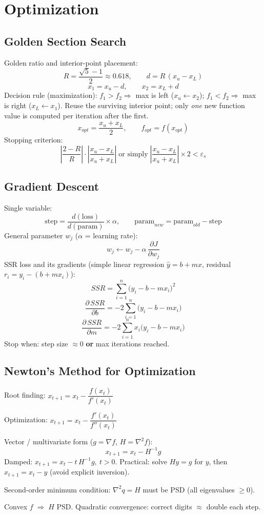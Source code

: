 \section{Optimization}

\subsection{Golden Section Search}
\begin{formulabox}
Golden ratio and interior-point placement:
\[
R = \frac{\sqrt5 - 1}{2} \approx 0.618, \qquad d = R\,(x_u - x_L)
\]
\[
x_1 = x_u - d, \qquad x_2 = x_L + d
\]
Decision rule (maximization): $f_1 > f_2 \Rightarrow$ max is left ($x_u \gets x_2$); $f_1 < f_2 \Rightarrow$ max is right ($x_L \gets x_1$).
Reuse the surviving interior point; only \emph{one} new function value is computed per iteration after the first.
\[
x_{opt} = \frac{x_u + x_L}{2}, \qquad f_{opt} = f(x_{opt})
\]
Stopping criterion:
\[
\left|\frac{2 - R}{R}\right|\cdot\left|\frac{x_u - x_L}{x_u+x_L}\right| \;\text{or simply}\; \left|\frac{x_u - x_L}{x_u + x_L}\right| \times 2 < \varepsilon_s
\]
\end{formulabox}

\subsection{Gradient Descent}
\begin{formulabox}
Single variable:
\[
\text{step} = \frac{d(\text{loss})}{d(\text{param})}\times \alpha, \qquad \text{param}_{new} = \text{param}_{old} - \text{step}
\]
General parameter $w_j$ ($\alpha$ = learning rate):
\[
w_j \leftarrow w_j - \alpha\,\frac{\partial J}{\partial w_j}
\]
SSR loss and its gradients (simple linear regression $\hat y = b + mx$, residual $r_i = y_i - (b+mx_i)$):
\[
SSR = \sum_{i=1}^n \big(y_i - b - m x_i\big)^2
\]
\[
\frac{\partial\, SSR}{\partial b} = -2\sum_{i=1}^n \big(y_i - b - mx_i\big)
\]
\[
\frac{\partial\, SSR}{\partial m} = -2\sum_{i=1}^n x_i\big(y_i - b - mx_i\big)
\]
Stop when: step size $\approx 0$ \textbf{or} max iterations reached.
\end{formulabox}

\subsection{Newton's Method for Optimization}
\begin{formulabox}
Root finding: \quad $x_{t+1} = x_t - \dfrac{f(x_t)}{f'(x_t)}$

Optimization: \quad $x_{t+1} = x_t - \dfrac{f'(x_t)}{f''(x_t)}$

Vector / multivariate form ($g=\nabla f$, $H = \nabla^2 f$):
\[
x_{t+1} = x_t - H^{-1} g
\]
Damped: $x_{t+1} = x_t - t\,H^{-1}g,\ t>0$. Practical: solve $Hy = g$ for $y$, then $x_{t+1} = x_t - y$ (avoid explicit inversion).

Second-order minimum condition: $\nabla^2 q = H$ must be PSD (all eigenvalues $\ge 0$).

Convex $f \;\Rightarrow\; H$ PSD. Quadratic convergence: correct digits $\approx$ double each step.
\end{formulabox}

